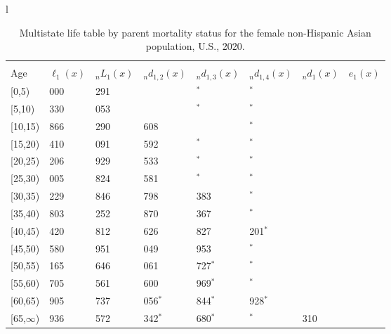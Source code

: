 \documentclass[
]{article}
\begin{document}
\begin{table}
\caption{\label{tab:table-nhasian-female}Multistate life table by parent mortality status for the female non-Hispanic Asian population, U.S., 2020.}

\centering
\fontsize{9}{11}\selectfont
\begin{tabular}[t]{l}
\hline
\begin{tabular}{>{\raggedright\arraybackslash}p{.45in}>{\raggedleft\arraybackslash}p{.65in}>{\raggedleft\arraybackslash}p{.65in}>{\raggedleft\arraybackslash}p{.65in}>{\raggedleft\arraybackslash}p{.65in}>{\raggedleft\arraybackslash}p{.65in}>{\raggedleft\arraybackslash}p{.65in}>{\raggedleft\arraybackslash}p{.65in}}
\toprule
\multicolumn{1}{c}{ } & \multicolumn{7}{c}{(1) Lost neither} \\
\cmidrule(l{3pt}r{3pt}){2-8}
Age & $\ell_{1}(x)$ & ${}_nL_{1}(x)$ & ${}_nd_{1,2}(x)$ & ${}_nd_{1,3}(x)$ & ${}_nd_{1,4}(x)$ & ${}_nd_{1}(x)$ & $e_{1}(x)$\\
\midrule
{}[0,5) & 100 000 & 496 291 & 873 & 395$^{*}$ & 60$^{*}$ & 342 & 44\\
{}[5,10) & 98 330 & 488 053 & 815 & 615$^{*}$ & 0$^{*}$ & 34 & 39\\
{}[10,15) & 96 866 & 478 290 & 1 608 & 811 & 0$^{*}$ & 38 & 34\\
{}[15,20) & 94 410 & 464 091 & 1 592 & 516$^{*}$ & 0$^{*}$ & 96 & 29\\
{}[20,25) & 92 206 & 447 929 & 2 533 & 552$^{*}$ & 0$^{*}$ & 117 & 25\\
\addlinespace
{}[25,30) & 89 005 & 425 824 & 3 581 & 884$^{*}$ & 201$^{*}$ & 110 & 20\\
{}[30,35) & 84 229 & 391 846 & 4 798 & 1 383 & 126$^{*}$ & 119 & 16\\
{}[35,40) & 77 803 & 350 252 & 3 870 & 1 367 & 0$^{*}$ & 146 & 12\\
{}[40,45) & 72 420 & 293 812 & 5 626 & 3 827 & 1 201$^{*}$ & 185 & 9\\
{}[45,50) & 61 580 & 221 951 & 9 049 & 2 953 & 182$^{*}$ & 231 & 6\\
\addlinespace
{}[50,55) & 49 165 & 148 646 & 5 061 & 3 727$^{*}$ & 422$^{*}$ & 250 & 3\\
{}[55,60) & 39 705 & 94 561 & 6 600 & 1 969$^{*}$ & 0$^{*}$ & 231 & 2\\
{}[60,65) & 30 905 & 36 737 & 4 056$^{*}$ & 2 844$^{*}$ & 1 928$^{*}$ & 142 & 1\\
{}[65,$\infty$) & 21 936 & 53 572 & 4 342$^{*}$ & 2 680$^{*}$ & 0$^{*}$ & 2 310 & 1\\

\end{tabular}
\end{tabular}
\end{table}
\end{document}
